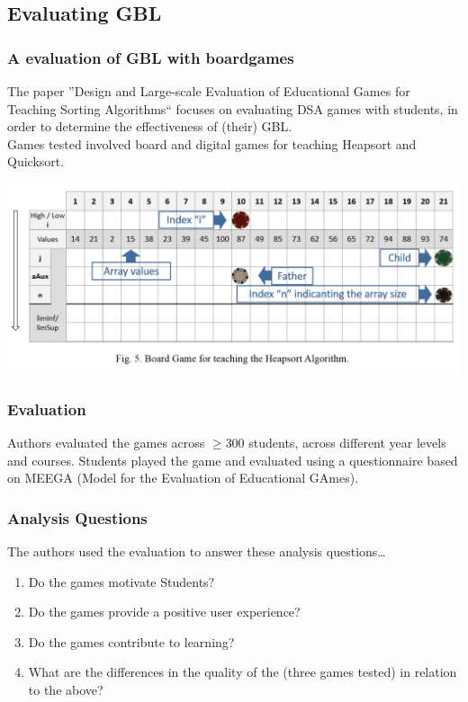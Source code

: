 \documentclass{beamer}
\begin{document}
\subsection{Evaluating GBL}
\begin{frame}
  \frametitle{A evaluation of GBL with boardgames}
  The paper ''Design and Large-scale Evaluation of Educational Games for Teaching Sorting Algorithms`` focuses on evaluating DSA games with students, in order to determine the effectiveness of (their) GBL.\\
  \pause
  Games tested involved board and digital games for teaching Heapsort and Quicksort.
\end{frame}
\begin{frame}
  \begin{center}
    \includegraphics[width=\textwidth,height=\textheight,keepaspectratio]{boardgame.png}
  \end{center}
\end{frame}
\begin{frame}
  \frametitle{Evaluation}
  Authors evaluated the games across $\geq 300$ students, across different year levels and courses. Students played the game and evaluated using a questionnaire based on MEEGA (Model for the Evaluation of Educational GAmes).
\end{frame}
\begin{frame}
  \frametitle{Analysis Questions}
  The authors used the evaluation to answer these analysis questions\dots
  \begin{enumerate}
    \item Do the games motivate Students?
    \item Do the games provide a positive user experience?
    \item Do the games contribute to learning?
    \item What are the differences in the quality of the (three games tested) in relation to the above?
  \end{enumerate}
\end{frame}
\end{document}
